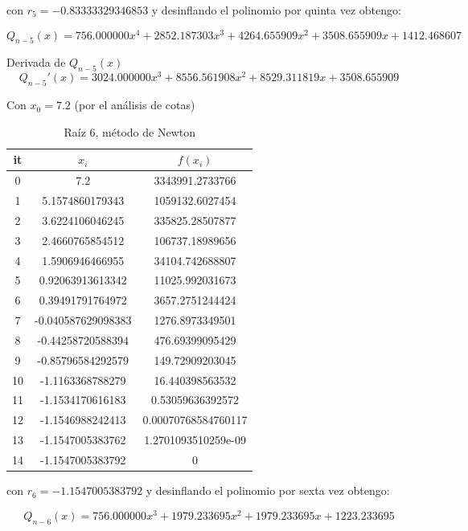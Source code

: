 \documentclass{article} %
\begin{document}
con $r_5 = -0.83333329346853$ y desinflando el polinomio por quinta vez obtengo:

\begin{equation*}
    Q_{n-5}(x) = 756.000000x^4 + 2852.187303x^3 + 4264.655909x^2 + 3508.655909x + 1412.468607
\end{equation*}

Derivada de $Q_{n-5}(x)$
\begin{equation*}
    Q_{n-5}'(x) = 3024.000000x^3 + 8556.561908x^2 + 8529.311819x + 3508.655909
\end{equation*}

Con $x_0 = 7.2$ (por el análisis de cotas)
\begin{table}[H]
\centering
\begin{tabular}{|c|c|c|}
\hline
it & $x_i$ & $f(x_i)$\\
\hline
0 & 7.2 & 3343991.2733766\\
1 & 5.1574860179343 & 1059132.6027454\\
2 & 3.6224106046245 & 335825.28507877\\
3 & 2.4660765854512 & 106737.18989656\\
4 & 1.5906946466955 & 34104.742688807\\
5 & 0.92063913613342 & 11025.992031673\\
6 & 0.39491791764972 & 3657.2751244424\\
7 & -0.040587629098383 & 1276.8973349501\\
8 & -0.44258720588394 & 476.69399095429\\
9 & -0.85796584292579 & 149.72909203045\\
10 & -1.1163368788279 & 16.440398563532\\
11 & -1.1534170616183 & 0.53059636392572\\
12 & -1.1546988242413 & 0.00070768584760117\\
13 & -1.1547005383762 & 1.2701093510259e-09\\
14 & -1.1547005383792 & 0\\
\hline
\end{tabular}
\caption{Raíz 6, método de Newton}
\end{table}

con $r_6 = -1.1547005383792$ y desinflando el polinomio por sexta vez obtengo:

\begin{equation*}
    Q_{n-6}(x) = 756.000000x^3 + 1979.233695x^2 + 1979.233695x + 1223.233695
\end{equation*}
\end{document}

